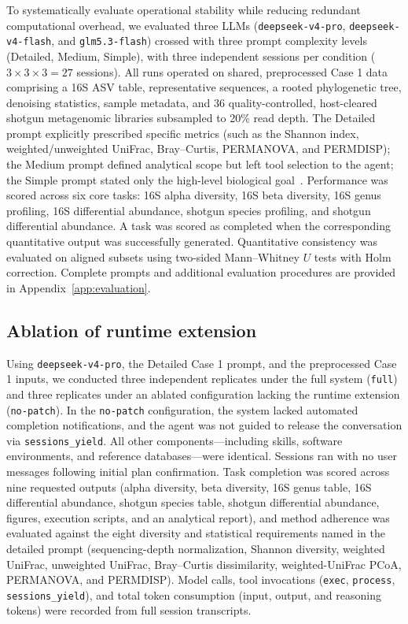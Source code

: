 \documentclass[10pt,letterpaper]{article}
\begin{document}
To systematically evaluate operational stability while reducing redundant
computational overhead, we evaluated three LLMs (\texttt{deepseek-v4-pro},
\texttt{deepseek-v4-flash}, and \texttt{glm5.3-flash}) crossed with three
prompt complexity levels (Detailed, Medium, Simple), with three independent
sessions per condition ($3 \times 3 \times 3 = 27$ sessions). All runs operated
on shared, preprocessed Case 1 data comprising a 16S ASV table, representative
sequences, a rooted phylogenetic tree, denoising statistics, sample metadata,
and 36 quality-controlled, host-cleared shotgun metagenomic libraries
subsampled to 20\% read depth. The Detailed prompt explicitly prescribed
specific metrics (such as the Shannon index, weighted/unweighted UniFrac,
Bray--Curtis, PERMANOVA, and PERMDISP); the Medium prompt defined analytical
scope but left tool selection to the agent; the Simple prompt stated only the
high-level biological goal~\cite{lozupone2007unifrac,anderson2001permanova}.
Performance was scored across six core tasks: 16S alpha diversity, 16S beta
diversity, 16S genus profiling, 16S
differential abundance, shotgun species profiling, and shotgun differential
abundance. A task was scored as completed when the corresponding quantitative
output was successfully generated. Quantitative consistency was evaluated on
aligned subsets using two-sided Mann--Whitney $U$ tests with Holm correction.
Complete prompts and additional evaluation procedures are provided in
Appendix~\ref{app:evaluation}.

\subsection{Ablation of runtime extension}

Using \texttt{deepseek-v4-pro}, the Detailed Case 1 prompt, and the
preprocessed Case 1 inputs, we conducted three independent replicates under the
full system (\texttt{full}) and three replicates under an ablated configuration
lacking the runtime extension (\texttt{no-patch}). 
In the \texttt{no-patch} configuration, the system lacked automated completion 
notifications, and the agent was not guided to release the conversation 
via \texttt{sessions\_yield}. All other
components---including skills, software environments, and reference
databases---were identical. Sessions ran with no user messages following
initial plan confirmation. Task completion was scored across nine requested
outputs (alpha diversity, beta diversity, 16S genus table, 16S differential
abundance, shotgun species table, shotgun differential abundance, figures,
execution scripts, and an analytical report), and method adherence was
evaluated against the eight diversity and statistical requirements named in the
detailed prompt (sequencing-depth normalization, Shannon diversity, weighted
UniFrac, unweighted UniFrac, Bray--Curtis dissimilarity, weighted-UniFrac PCoA,
PERMANOVA, and PERMDISP). Model calls, tool invocations (\texttt{exec},
\texttt{process}, \texttt{sessions\_yield}), and total token consumption
(input, output, and reasoning tokens) were recorded from full session
transcripts.
\end{document}
